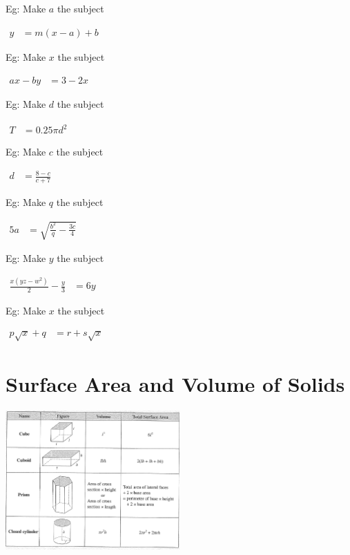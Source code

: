 \documentclass[twocolumn]{article}
\begin{document}
\noindent 
Eg: Make $a$ the subject

\noindent 
$\begin{aligned} y & = m(x-a)+b \end{aligned}$

\bigskip 

\noindent 
Eg: Make $x$ the subject

\noindent 
$\begin{aligned} a x-b y & =3-2 x  \end{aligned}$

\bigskip 

\noindent 
Eg: Make $d$ the subject

\noindent 
$\begin{aligned} T & =0.25 \pi d^2  \end{aligned}$

\bigskip 

\noindent 
Eg: Make $c$ the subject

\noindent 
$\begin{aligned} d & =\frac{8-c}{c+7}  \end{aligned}$

\bigskip 
\noindent 
Eg: Make $q$ the subject

\noindent 
$\begin{aligned} 5 a & =\sqrt{\frac{b^2}{q}-\frac{3 c}{4}} \end{aligned}$

\bigskip 

\noindent 
Eg: Make $y$ the subject

\noindent 
$\begin{aligned} \frac{x\left(y z-w^2\right)}{2}-\frac{y}{3} & =6 y  \end{aligned}$

\bigskip 

\noindent 
Eg: Make $x$ the subject

\noindent 
$\begin{aligned} p \sqrt{x}+q & =r+s \sqrt{x}  \end{aligned}$


\section*{Surface Area and Volume of Solids}

\includegraphics[width=0.5\textwidth]{82.png}
\end{document}
